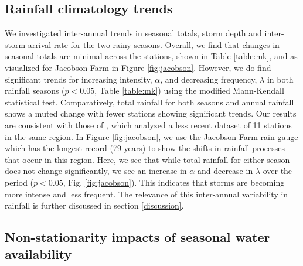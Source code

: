 \subsection{Rainfall climatology trends}

We investigated inter-annual trends in seasonal totals, storm depth and inter-storm arrival rate for the two rainy seasons. Overall, we find that changes in seasonal totals are minimal across the stations, shown in Table \ref{table:mk}, and as visualized for Jacobson Farm in Figure \ref{fig:jacobson}. However, we do find significant trends for increasing intensity, $\alpha$, and decreasing frequency, $\lambda$ in both rainfall seasons ($p < 0.05$, Table \ref{table:mk}) using the modified Mann-Kendall statistical test. Comparatively, total rainfall for both seasons and annual rainfall shows a muted change with fewer stations showing significant trends. Our results are consistent with those of , which analyzed a less recent dataset of 11 stations in the same region. In Figure \ref{fig:jacobson}, we use the Jacobson Farm rain gauge which has the longest record (79  years) to show the shifts in rainfall processes that occur in this region. Here, we see that while total rainfall for either season does not change significantly, we see an increase in $\alpha$ and decrease in $\lambda$ over the period ($p < 0.05$, Fig. \ref{fig:jacobson}). This indicates that storms are becoming more intense and less frequent. The relevance of this inter-annual variability in rainfall is further discussed in section \ref{discussion}.

\subsection{Non-stationarity impacts of seasonal water availability} \label{non-stationarity}

